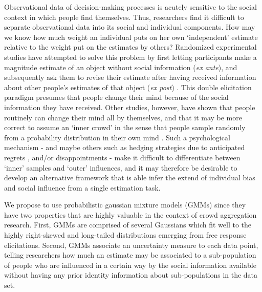 \documentclass[9pt,twocolumn,twoside,lineno]{pnas-new}
\begin{document}
Observational data of decision-making processes is acutely sensitive to the social context in which people find themselves. Thus, researchers find it difficult to separate observational data into its social and individual components. How may we know how much weight an individual puts on her own ‘independent’ estimate relative to the weight put on the estimates by others? Randomized experimental studies have attempted to solve this problem by first letting participants make a magnitude estimate of an object without social information (\textit{ex ante}), and subsequently ask them to revise their estimate after having received information about other people’s estimates of that object (\textit{ex post}) \cite{becker2017network, jayles2017social, lorenz2011social, sniezek1995cueing, mavrodiev2013quantifying}. This double elicitation paradigm presumes that people change their mind because of the social information they have received. Other studies, however, have shown that people routinely can change their mind all by themselves, and that it may be more correct to assume an `inner crowd' in the sense that people sample randomly from a probability distribution in their own mind \cite{vul2008measuring, herzog2009wisdom, herzog2014harnessing}. Such a psychological mechanism - and maybe others such as hedging strategies due to anticipated regrets \cite{bell1982regret}, and/or disappointments \cite{loomes1986disappointment} - make it difficult to differentiate between `inner' samples and `outer' influences, and it may therefore be desirable to develop an alternative framework that is able infer the extend of individual bias and social influence from a single estimation task.

We propose to use probabilistic gaussian mixture models (GMMs) since they have two properties that are highly valuable in the context of crowd aggregation research. First, GMMs are comprised of several Gaussians which fit well to the highly right-skewed and long-tailed distributions emerging from free response elicitations. Second, GMMs associate an uncertainty measure to each data point, telling researchers how much an estimate may be associated to a sub-population of people who are influenced in a certain way by the social information available without having any prior identity information about sub-populations in the data set.

\end{document}
